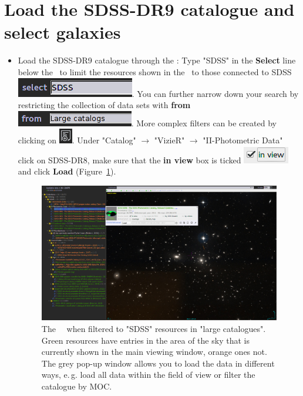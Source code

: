 \documentclass [a4paper, 12pt]{article}
\begin{document}
\section{Load the SDSS-DR9 catalogue and select galaxies}

\begin{itemize}
\item Load the SDSS-DR9 catalogue through the \datatree: Type "SDSS" in the
\textbf{Select} line below the \datatree\ to limit the resources shown in the
\datatree\ to those connected to SDSS \includegraphics[width=0.2
\textwidth]{../images/aladin_select_SDSS.png}. You can further narrow down your
search by restricting the collection of data sets with \textbf{from}
\includegraphics[width=0.2
\textwidth]{../images/aladin_selectfrom_largecatalogues.png}. More complex
filters can be created by clicking on \includegraphics[width=0.03
\textwidth]{../images/aladin_button_filtertree.png}. Under "Catalog"
$\rightarrow$ "VizieR" $\rightarrow$ "II-Photometric Data" click on SDSS-DR8,
make sure that the \textbf{in view} box is ticked \includegraphics[width=0.07
\textwidth]{../images/aladin_load_inview.png} and click \textbf{Load}
(Figure~\ref{fig:aladinSDSS}).

\begin{figure}[H]
\center
\includegraphics[width=0.85
\textwidth]{../images/aladin_load_sdss_a1656.png}
\caption{The \aladin\ \datatree\ when filtered to "SDSS" resources in "large
catalogues". Green resources have entries in the area of the sky that is
currently shown in the main viewing window, orange ones not. The grey pop-up
window allows you to load the data in different ways, e.\,g. load all data
within the field of view or filter the catalogue by MOC. }
\label{fig:aladinSDSS}
\end{figure}


\end{itemize}
\end{document}

